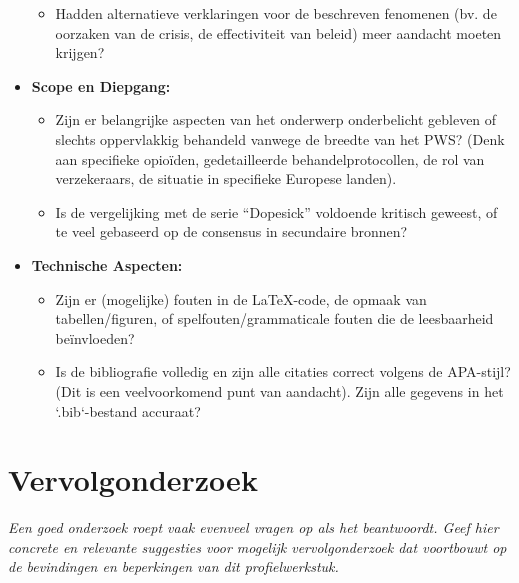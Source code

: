 \documentclass[11pt, a4paper]{report} %
\begin{document}
\begin{itemize}
\begin{itemize}
            \item Hadden alternatieve verklaringen voor de beschreven fenomenen (bv. de oorzaken van de crisis, de effectiviteit van beleid) meer aandacht moeten krijgen?
        \end{itemize}
    \item \textbf{Scope en Diepgang:}
        \begin{itemize}
            \item Zijn er belangrijke aspecten van het onderwerp onderbelicht gebleven of slechts oppervlakkig behandeld vanwege de breedte van het PWS? (Denk aan specifieke opioïden, gedetailleerde behandelprotocollen, de rol van verzekeraars, de situatie in specifieke Europese landen).
            \item Is de vergelijking met de serie \enquote{Dopesick} voldoende kritisch geweest, of te veel gebaseerd op de consensus in secundaire bronnen?
        \end{itemize}
    \item \textbf{Technische Aspecten:}
        \begin{itemize}
            \item Zijn er (mogelijke) fouten in de LaTeX-code, de opmaak van tabellen/figuren, of spelfouten/grammaticale fouten die de leesbaarheid beïnvloeden?
            \item Is de bibliografie volledig en zijn alle citaties correct volgens de APA-stijl? (Dit is een veelvoorkomend punt van aandacht). Zijn alle gegevens in het `.bib`-bestand accuraat?
        \end{itemize}
\end{itemize}
\lipsum[6-7] %


\chapter{Vervolgonderzoek}
\label{chap:vervolgonderzoek}

\textit{Een goed onderzoek roept vaak evenveel vragen op als het beantwoordt. Geef hier concrete en relevante suggesties voor mogelijk vervolgonderzoek dat voortbouwt op de bevindingen en beperkingen van dit profielwerkstuk.}
\end{document}
